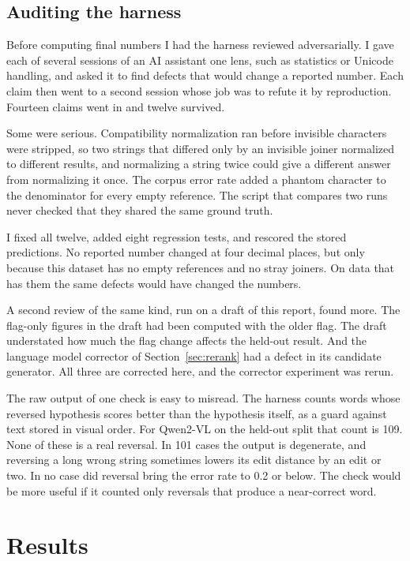 \documentclass[11pt,a4paper]{article}
\begin{document}
\subsection{Auditing the harness}
\label{sec:audit}

Before computing final numbers I had the harness reviewed adversarially. I
gave each of several sessions of an AI assistant one lens, such as statistics
or Unicode handling, and asked it to find defects that would change a reported
number. Each claim then went to a second session whose job was to refute it
by reproduction. Fourteen claims went in and twelve survived.

Some were serious. Compatibility normalization ran before invisible characters
were stripped, so two strings that differed only by an invisible joiner
normalized to different results, and normalizing a string twice could give a
different answer from normalizing it once. The corpus error rate added a
phantom character to the denominator for every empty reference. The script
that compares two runs never checked that they shared the same ground truth.

I fixed all twelve, added eight regression tests, and rescored the stored
predictions. No reported number changed at four decimal places, but only
because this dataset has no empty references and no stray joiners. On data
that has them the same defects would have changed the numbers.

A second review of the same kind, run on a draft of this report, found more.
The flag-only figures in the draft had been computed with the older flag. The
draft understated how much the flag change affects the held-out result. And
the language model corrector of Section~\ref{sec:rerank} had a defect in its
candidate generator. All three are corrected here, and the corrector
experiment was rerun.

The raw output of one check is easy to misread. The harness counts words
whose reversed hypothesis scores better than the hypothesis itself, as a
guard against text stored in visual order. For Qwen2-VL on the held-out split
that count is 109. None of these is a real reversal. In 101 cases the output
is degenerate, and reversing a long wrong string sometimes lowers its edit
distance by an edit or two. In no case did reversal bring the error rate to
0.2 or below. The check would be more useful if it counted only reversals
that produce a near-correct word.

\section{Results}
\end{document}
